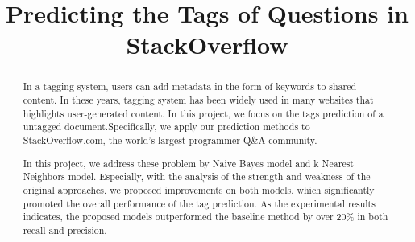\documentclass{article} %
\title{Predicting the Tags of Questions in StackOverflow}
\begin{document}
\maketitle

\begin{abstract}
In a tagging system, users can add metadata in the form of keywords to shared content. In these years, tagging system has been widely used in many websites that highlights user-generated content. In this project, we focus on the tags prediction of a untagged document.Specifically, we apply our prediction methods to StackOverflow.com, the world's largest programmer Q\&A community.

In this project, we address these problem by Naive Bayes model and k Nearest Neighbors model. Especially, with the analysis of the strength and weakness of the original approaches, we proposed improvements on both models, which significantly promoted the overall performance of the tag prediction. As the experimental results indicates, the proposed models outperformed the baseline method by over 20\% in both recall and precision.

\end{abstract}











\small{


}
\end{document}
